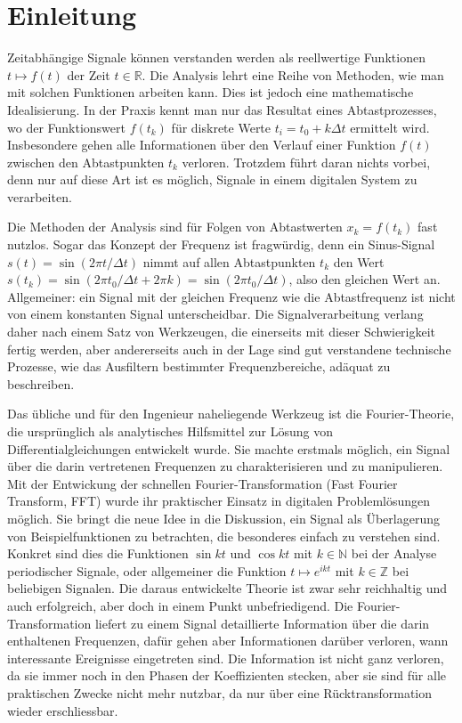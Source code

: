 %
%
%
\chapter*{Einleitung\label{chapter:einleitung}}
Zeitabhängige Signale können verstanden werden als reellwertige
Funktionen $t\mapsto f(t)$ der Zeit $t\in\mathbb R$.
Die Analysis lehrt eine Reihe von Methoden, wie man mit solchen
Funktionen arbeiten kann.
Dies ist jedoch eine mathematische Idealisierung.
In der Praxis kennt man nur das Resultat eines Abtastprozesses, wo
der Funktionswert $f(t_k)$ für diskrete Werte $t_i=t_0 + k\Delta t$
ermittelt wird.
Insbesondere gehen alle Informationen über den Verlauf einer Funktion $f(t)$
zwischen den Abtastpunkten $t_k$ verloren.
Trotzdem führt daran nichts vorbei, denn nur auf diese Art ist es möglich,
Signale in einem digitalen System zu verarbeiten.

%
Die Methoden der Analysis sind für Folgen von Abtastwerten $x_k=f(t_k)$
fast nutzlos.
Sogar das Konzept der Frequenz ist fragwürdig, denn ein Sinus-Signal
$s(t)=\sin(2\pi t/\Delta t)$ nimmt auf allen Abtastpunkten $t_k$
den Wert $s(t_k)=\sin(2\pi t_0/\Delta t+2\pi k)=\sin(2\pi t_0/\Delta t)$,
also den gleichen Wert an.
Allgemeiner: ein Signal mit der gleichen Frequenz wie die Abtastfrequenz
ist nicht von einem konstanten Signal unterscheidbar.
Die Signalverarbeitung verlang daher nach einem Satz von Werk\-zeugen, die
einerseits mit dieser Schwierigkeit fertig werden, aber andererseits auch
in der Lage sind gut verstandene technische Prozesse, wie das Ausfiltern
bestimmter Frequenzbereiche, adäquat zu beschreiben.

Das übliche und für den Ingenieur naheliegende Werkzeug ist die 
Fourier-Theorie, die ursprünglich als analytisches Hilfsmittel zur Lösung
%
von Differentialgleichungen entwickelt wurde.
Sie machte erstmals möglich, ein Signal über die darin vertretenen
Frequenzen zu charakterisieren und zu manipulieren.
Mit der Entwickung der schnellen Fourier-Transformation
(Fast Fourier Transform, FFT) wurde ihr praktischer Einsatz in digitalen
Problemlösungen möglich.
%
%
Sie bringt die neue Idee in die Diskussion, ein Signal als Überlagerung
von Beispielfunktionen zu betrachten, die besonderes einfach zu
verstehen sind.
Konkret sind dies die Funktionen $\sin kt$ und $\cos kt$ mit
$k\in\mathbb N$ bei der Analyse periodischer Signale,
oder allgemeiner die Funktion $t\mapsto e^{ikt}$ mit $k\in\mathbb Z$
bei beliebigen Signalen.
Die daraus entwickelte Theorie ist zwar sehr reichhaltig und auch erfolgreich,
aber doch in einem Punkt unbefriedigend.
Die Fourier-Transformation liefert zu einem Signal detaillierte Information
über die darin enthaltenen Frequenzen, dafür gehen aber Informationen
darüber verloren, wann interessante Ereignisse eingetreten sind.
Die Information ist nicht ganz verloren, da sie immer noch in den Phasen
der Koeffizienten stecken, aber sie sind für alle praktischen Zwecke 
nicht mehr nutzbar, da nur über eine Rücktransformation wieder erschliessbar.

